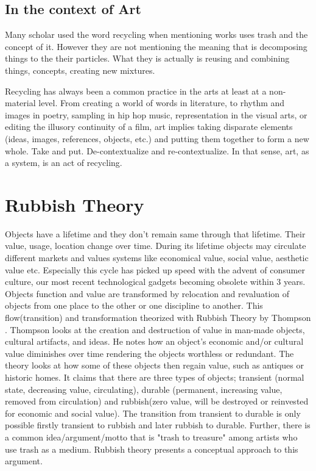 \documentclass[12pt]{article}
\begin{document}
\subsection{In the context of Art}
Many scholar used the word recycling when mentioning works uses trash and the concept of it. However they are not mentioning the meaning that is decomposing things to the their particles. What they is actually is reusing and combining things, concepts, creating new mixtures.

Recycling has always been a common practice in the arts at least at a non-material level. From creating a world of words in literature, to rhythm and images in poetry, sampling in hip hop music, representation in the visual arts, or editing the illusory continuity of a film, art implies taking disparate elements (ideas, images, references, objects, etc.) and putting them together to form a new whole. Take and put. De-contextualize and re-contextualize. In that sense, art, as a system, is an act of recycling. 

\section{Rubbish Theory}
Objects have a lifetime and they don't remain same through that lifetime. Their value, usage, location change over time. During its lifetime objects may circulate different markets and values systems like economical value, social value, aesthetic value etc. Especially this cycle has picked up speed with the advent of consumer culture, our most recent technological gadgets becoming obsolete within 3 years. Objects function and value are transformed by relocation and revaluation of objects from one place to the other or one discipline to another. This flow(transition) and transformation theorized with Rubbish Theory by Thompson \cite{thompson1979rubbish}. Thompson looks at the creation and destruction of value in man-made objects, cultural artifacts, and ideas. He notes how an object’s economic and/or cultural value diminishes over time rendering the objects worthless or redundant. The theory looks at how some of these objects then regain value, such as antiques or historic homes. It claims that there are three types of objects; transient (normal state, decreasing value, circulating), durable (permanent, increasing value, removed from circulation) and rubbish(zero value, will be destroyed or reinvested for economic and social value). The transition from transient to durable is only possible firstly transient to rubbish and later rubbish to durable. Further, there is a common idea/argument/motto that is "trash to treasure" among artists who use trash as a medium. Rubbish theory presents a conceptual approach to this argument. 
\end{document}
